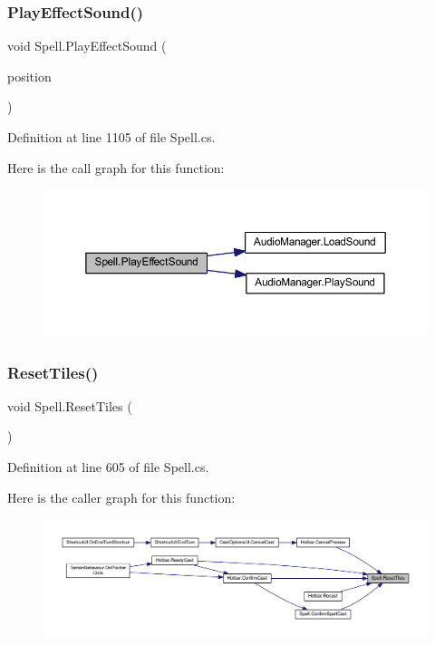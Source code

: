 \subsubsection{\texorpdfstring{PlayEffectSound()}{PlayEffectSound()}}
{\footnotesize\ttfamily void Spell.\+Play\+Effect\+Sound (\begin{DoxyParamCaption}\item[{Vector2\+Int}]{position }\end{DoxyParamCaption})}



Definition at line 1105 of file Spell.\+cs.

Here is the call graph for this function\+:
\nopagebreak
\begin{figure}[H]
\begin{center}
\leavevmode
\includegraphics[width=350pt]{class_spell_a1dfbc90153df551bd995b8b852f808f0_cgraph}
\end{center}
\end{figure}
\mbox{\label{class_spell_a267e0b312732b826127c2d58ba64d90d}} 
\subsubsection{\texorpdfstring{ResetTiles()}{ResetTiles()}}
{\footnotesize\ttfamily void Spell.\+Reset\+Tiles (\begin{DoxyParamCaption}{ }\end{DoxyParamCaption})}



Definition at line 605 of file Spell.\+cs.

Here is the caller graph for this function\+:
\nopagebreak
\begin{figure}[H]
\begin{center}
\leavevmode
\includegraphics[width=350pt]{class_spell_a267e0b312732b826127c2d58ba64d90d_icgraph}
\end{center}
\end{figure}
\mbox{\label{class_spell_ad49f8d3af9c5a885120ca85b510eae75}} 

